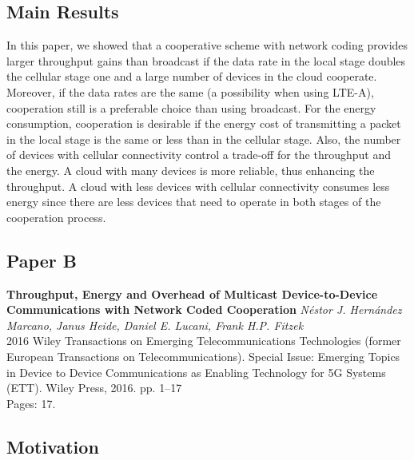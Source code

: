 \subsection*{Main Results}
In this paper, we showed that a cooperative scheme with network coding provides larger throughput gains than broadcast if the data rate in the local stage doubles the cellular stage one and a large number of devices in the cloud cooperate. Moreover, if the data rates are the same (a possibility when using LTE-A), cooperation still is a preferable choice than using broadcast. For the energy consumption, cooperation is desirable if the energy cost of transmitting a packet in the local stage is the same or less than in the cellular stage. Also, the number of devices with cellular connectivity control a trade-off for the throughput and the energy. A cloud with many devices is more reliable, thus enhancing the throughput. A cloud with less devices with cellular connectivity consumes less energy since there are less devices that need to operate in both stages of the cooperation process.

\clearpage

\subsection{Paper B}
\textbf{Throughput, Energy and Overhead of Multicast Device-to-Device Communications with Network Coded Cooperation}
\textit{N\'estor J. Hern\'andez Marcano, Janus Heide, Daniel E. Lucani, Frank H.P. Fitzek}
\\  2016 Wiley Transactions on Emerging Telecommunications Technologies (former
European Transactions on Telecommunications). Special Issue: Emerging Topics in
Device to Device Communications as Enabling Technology for 5G Systems (ETT). Wiley Press, 2016. pp. 1--17
\\ Pages: 17.


\subsection*{Motivation}
